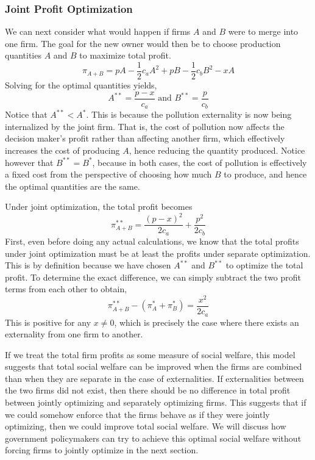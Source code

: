 \subsubsection*{Joint Profit Optimization}
We can next consider what would happen if firms $A$ and $B$ were to merge into one firm. The goal for the new owner would then be to choose production quantities $A$ and $B$ to maximize total profit.
\begin{equation*}
    \pi_{A + B} = pA - \frac{1}{2} c_a A^2 + pB - \frac{1}{2} c_b B^2 - xA
\end{equation*}
Solving for the optimal quantities yields,
\begin{equation*}
    A^{**} = \frac{p - x}{c_a} \text{ and } B^{**} = \frac{p}{c_b}
\end{equation*}
Notice that $A^{**} < A^*$. This is because the pollution externality is now being internalized by the joint firm. That is, the cost of pollution now affects the decision maker's profit rather than affecting another firm, which effectively increases the cost of producing $A$, hence reducing the quantity produced. Notice however that $B^{**} = B^*$, because in both cases, the cost of pollution is effectively a fixed cost from the perspective of choosing how much $B$ to produce, and hence the optimal quantities are the same. 

Under joint optimization, the total profit becomes
\begin{equation*}
    \pi_{A + B}^{**} = \frac{(p - x)^2}{2 c_a} + \frac{p^2}{2 c_b}
\end{equation*}
First, even before doing any actual calculations, we know that the total profits under joint optimization must be at least the profits under separate optimization. This is by definition because we have chosen $A^{**}$ and $B^{**}$ to optimize the total profit. To determine the exact difference, we can simply subtract the two profit terms from each other to obtain,
\begin{equation*}
    \pi_{A + B}^{**} - (\pi_A^* + \pi_B^*) = \frac{x^2}{2c_a}
\end{equation*}
This is positive for any $x \neq 0$, which is precisely the case where there exists an externality from one firm to another. 

If we treat the total firm profits as some measure of social welfare, this model suggests that total social welfare can be improved when the firms are combined than when they are separate in the case of externalities. If externalities between the two firms did not exist, then there should be no difference in total profit between jointly optimizing and separately optimizing firms. This suggests that if we could somehow enforce that the firms behave as if they were jointly optimizing, then we could improve total social welfare. We will discuss how government policymakers can try to achieve this optimal social welfare without forcing firms to jointly optimize in the next section. 
